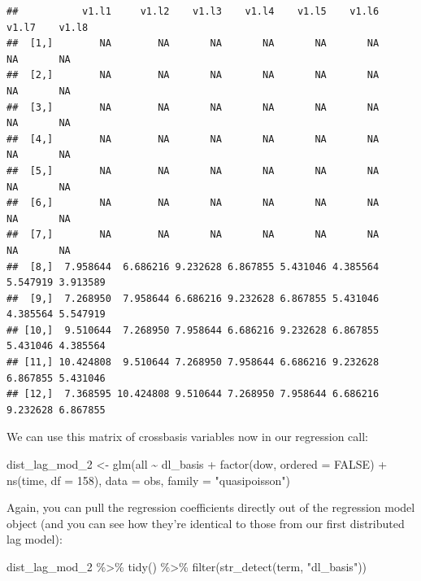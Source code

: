 \documentclass[
]{book}
\newenvironment{Shaded}{\begin{snugshade}}{\end{snugshade}}
\newcommand{\AttributeTok}[1]{\textcolor[rgb]{0.77,0.63,0.00}{#1}}
\newcommand{\ConstantTok}[1]{\textcolor[rgb]{0.00,0.00,0.00}{#1}}
\newcommand{\DecValTok}[1]{\textcolor[rgb]{0.00,0.00,0.81}{#1}}
\newcommand{\FunctionTok}[1]{\textcolor[rgb]{0.00,0.00,0.00}{#1}}
\newcommand{\NormalTok}[1]{#1}
\newcommand{\OtherTok}[1]{\textcolor[rgb]{0.56,0.35,0.01}{#1}}
\newcommand{\SpecialCharTok}[1]{\textcolor[rgb]{0.00,0.00,0.00}{#1}}
\newcommand{\StringTok}[1]{\textcolor[rgb]{0.31,0.60,0.02}{#1}}
\begin{document}
\begin{verbatim}
##           v1.l1     v1.l2    v1.l3    v1.l4    v1.l5    v1.l6    v1.l7    v1.l8
##  [1,]        NA        NA       NA       NA       NA       NA       NA       NA
##  [2,]        NA        NA       NA       NA       NA       NA       NA       NA
##  [3,]        NA        NA       NA       NA       NA       NA       NA       NA
##  [4,]        NA        NA       NA       NA       NA       NA       NA       NA
##  [5,]        NA        NA       NA       NA       NA       NA       NA       NA
##  [6,]        NA        NA       NA       NA       NA       NA       NA       NA
##  [7,]        NA        NA       NA       NA       NA       NA       NA       NA
##  [8,]  7.958644  6.686216 9.232628 6.867855 5.431046 4.385564 5.547919 3.913589
##  [9,]  7.268950  7.958644 6.686216 9.232628 6.867855 5.431046 4.385564 5.547919
## [10,]  9.510644  7.268950 7.958644 6.686216 9.232628 6.867855 5.431046 4.385564
## [11,] 10.424808  9.510644 7.268950 7.958644 6.686216 9.232628 6.867855 5.431046
## [12,]  7.368595 10.424808 9.510644 7.268950 7.958644 6.686216 9.232628 6.867855
\end{verbatim}

We can use this matrix of crossbasis variables now in our regression call:

\begin{Shaded}
\begin{Highlighting}[]
\NormalTok{dist\_lag\_mod\_2 }\OtherTok{\textless{}{-}} \FunctionTok{glm}\NormalTok{(all }\SpecialCharTok{\textasciitilde{}}\NormalTok{ dl\_basis }\SpecialCharTok{+} 
                        \FunctionTok{factor}\NormalTok{(dow, }\AttributeTok{ordered =} \ConstantTok{FALSE}\NormalTok{) }\SpecialCharTok{+}
                          \FunctionTok{ns}\NormalTok{(time, }\AttributeTok{df =} \DecValTok{158}\NormalTok{), }
                        \AttributeTok{data =}\NormalTok{ obs, }\AttributeTok{family =} \StringTok{"quasipoisson"}\NormalTok{)}
\end{Highlighting}
\end{Shaded}

Again, you can pull the regression coefficients directly out of the regression model object
(and you can see how they're identical to those from our first distributed lag model):

\begin{Shaded}
\begin{Highlighting}[]
\NormalTok{dist\_lag\_mod\_2 }\SpecialCharTok{\%\textgreater{}\%} 
  \FunctionTok{tidy}\NormalTok{() }\SpecialCharTok{\%\textgreater{}\%} 
  \FunctionTok{filter}\NormalTok{(}\FunctionTok{str\_detect}\NormalTok{(term, }\StringTok{"dl\_basis"}\NormalTok{))}
\end{Highlighting}
\end{Shaded}
\end{document}
